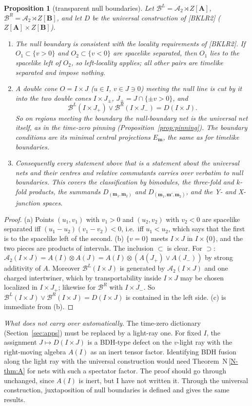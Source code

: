 \documentclass[11pt]{article}
\newtheorem{proposition}[theorem]{Proposition}
\theoremstyle{definition}
\theoremstyle{remark}
\newcommand{\cA}{\mathcal A}
\newcommand{\cB}{\mathcal B}
\newcommand{\bfB}{\mathbf B}
\newcommand{\bfA}{\mathbf A}
\newcommand{\nref}[1]{N\,\ref{N-#1}}
\begin{document}
\begin{proposition}[transparent null boundaries]\label{prop:null}
Let $\cB^L=\cA_2\rtimes Z[\bfA]$, $\cB^R=\cA_2\rtimes Z[\bfB]$, and let $D$ be the universal construction of [BKLR2] ($Z[\bfA]\times Z[\bfB]$).
\begin{enumerate}[nosep,label=(\alph*)]
\item The null boundary is consistent with the locality requirements of [BKLR2]. If $O_1\subset\{v>0\}$ and $O_2\subset\{v<0\}$ are spacelike separated, then $O_1$ lies to the spacelike left of $O_2$, so left-locality applies; all other pairs are timelike separated and impose nothing.
\item A double cone $O=I\times J$ ($u\in I$, $v\in J\ni0$) meeting the null line is cut by it into the two double cones $I\times J_\pm$, $J_\pm=J\cap\{\pm v>0\}$, and
\[
\cB^L(I\times J_+)\vee\cB^R(I\times J_-)=D(I\times J).
\]
So on regions meeting the boundary the null-boundary net is the universal net itself, as in the time-zero pinning (Proposition~\ref{prop:pinning}). The boundary conditions are its minimal central projections $E_{\mathbf m}$, the same as for timelike boundaries.
\item Consequently every statement above that is a statement about the universal nets and their centres and relative commutants carries over verbatim to null boundaries. This covers the classification by bimodules, the three-fold and $k$-fold products, the summands $D_{(\mathbf m_1,\mathbf m_2)}$ and $D_{(\mathbf m_1,\mathbf m',\mathbf m_2)}$, and the Y- and X-junction spaces.
\end{enumerate}
\end{proposition}
\begin{proof}
(a) Points $(u_1,v_1)$ with $v_1>0$ and $(u_2,v_2)$ with $v_2<0$ are spacelike separated iff $(u_1-u_2)(v_1-v_2)<0$, i.e.\ iff $u_1<u_2$, which says that the first is to the spacelike left of the second. (b) $\{v=0\}$ meets $I\times J$ in $I\times\{0\}$, and the two pieces are products of intervals. The inclusion $\subset$ is clear. For $\supset$: $\cA_2(I\times J)=A(I)\otimes A(J)=A(I)\otimes(A(J_+)\vee A(J_-))$ by strong additivity of $A$. Moreover $\cB^L(I\times J)$ is generated by $\cA_2(I\times J)$ and one charged intertwiner, which by transportability inside $I\times J$ may be chosen localized in $I\times J_+$; likewise for $\cB^R$ with $I\times J_-$. So $\cB^L(I\times J)\vee\cB^R(I\times J)=D(I\times J)$ is contained in the left side. (c) is immediate from (b).
\end{proof}
\emph{What does not carry over automatically.} The time-zero dictionary (Section~\ref{sec:apps}) must be replaced by a light-ray one. For fixed $I$, the assignment $J\mapsto D(I\times J)$ is a BDH-type defect on the $v$-light ray with the right-moving algebra $A(I)$ as an inert tensor factor. Identifying BDH fusion along the light ray with the universal construction would need Theorem~\nref{thm:A} for nets with such a spectator factor. The proof should go through unchanged, since $A(I)$ is inert, but I have not written it. Through the universal construction, juxtaposition of null boundaries is defined and gives the same results.
\end{document}
